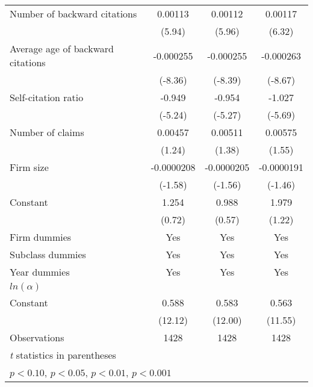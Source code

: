 \begin{table}[htbp]
\begin{tabular}{l*{3}{c}}
\addlinespace
Number of backward citations&     0.00113\sym{***}&     0.00112\sym{***}&     0.00117\sym{***}\\
                    &      (5.94)         &      (5.96)         &      (6.32)         \\
\addlinespace
Average age of backward citations&   -0.000255\sym{***}&   -0.000255\sym{***}&   -0.000263\sym{***}\\
                    &     (-8.36)         &     (-8.39)         &     (-8.67)         \\
\addlinespace
Self-citation ratio &      -0.949\sym{***}&      -0.954\sym{***}&      -1.027\sym{***}\\
                    &     (-5.24)         &     (-5.27)         &     (-5.69)         \\
\addlinespace
Number of claims    &     0.00457         &     0.00511         &     0.00575         \\
                    &      (1.24)         &      (1.38)         &      (1.55)         \\
\addlinespace
Firm size           &  -0.0000208         &  -0.0000205         &  -0.0000191         \\
                    &     (-1.58)         &     (-1.56)         &     (-1.46)         \\
\addlinespace
Constant            &       1.254         &       0.988         &       1.979         \\
                    &      (0.72)         &      (0.57)         &      (1.22)         \\
\addlinespace
Firm dummies&Yes&Yes&Yes\\
\addlinespace
Subclass dummies&Yes&Yes&Yes\\
\addlinespace
Year dummies&Yes&Yes&Yes\\
\midrule
$ln(\alpha)$             &                     &                     &                     \\
Constant            &       0.588\sym{***}&       0.583\sym{***}&       0.563\sym{***}\\
                    &     (12.12)         &     (12.00)         &     (11.55)         \\
\midrule
Observations        &        1428         &        1428         &        1428         \\
\bottomrule
\multicolumn{4}{l}{\footnotesize \textit{t} statistics in parentheses}\\
\multicolumn{4}{l}{\footnotesize \sym{+} \(p<0.10\), \sym{*} \(p<0.05\), \sym{**} \(p<0.01\), \sym{***} \(p<0.001\)}\\
\end{tabular}
\end{table}
